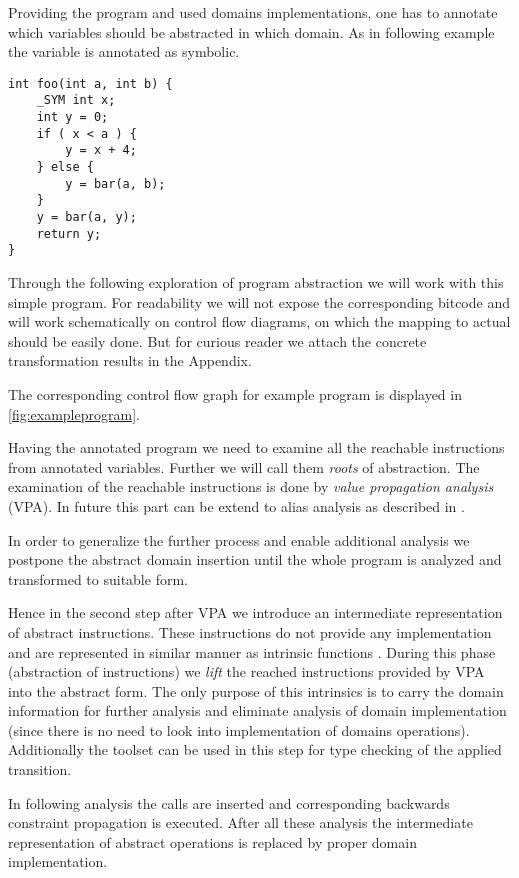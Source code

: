 Providing the program and used domains implementations, one has
to annotate which variables should be abstracted in which domain. As in
following example the variable  is annotated as symbolic.
\begin{verbatim}
int foo(int a, int b) {
    _SYM int x;
    int y = 0;
    if ( x < a ) {
        y = x + 4;
    } else {
        y = bar(a, b);
    }
    y = bar(a, y);
    return y;
}
\end{verbatim}
Through the following exploration of program abstraction we will work with this
simple \Cpp{} program. For readability we will not expose the corresponding \LLVM
bitcode and will work schematically on control flow diagrams, on which the
mapping to actual \LLVM should be easily done. But for curious reader we attach the
concrete \LLVM transformation results in the Appendix.


The corresponding control flow graph for example program is displayed in
\autoref{fig:exampleprogram}.

Having the annotated program we need to examine all the reachable instructions
from annotated variables. Further we will call them \emph{roots} of abstraction.
The examination of the reachable instructions is done by \emph{value propagation
analysis} (VPA).
In future this part can be extend to alias analysis as described in
\cite{Rockai15}.

In order to generalize the further process and enable additional analysis we
postpone the abstract domain insertion until the whole program is analyzed and
transformed to suitable form.

Hence in the second step after VPA we introduce an intermediate representation of
abstract instructions. These instructions do not provide any implementation and
are represented in similar manner as \LLVM intrinsic functions
\cite{LLVM:langref}. During this phase (abstraction of instructions) we
\emph{lift} the reached instructions provided by VPA into the abstract form. The
only purpose of this intrinsics is to carry the domain information for further
analysis and eliminate analysis of domain implementation (since there is no need
to look into implementation of domains operations). Additionally the \LLVM
toolset can be used in this step for type checking of the applied transition.

In following analysis the  calls are inserted and corresponding
backwards constraint propagation is executed. After all these analysis the
intermediate representation of abstract operations is replaced by proper domain
implementation.

